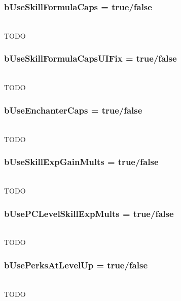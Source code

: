 \documentclass[12pt]{amsart}
\begin{document}
\startblock
\subsubsection{bUseSkillFormulaCaps = \textlangle true/false\textrangle}\hfill\\

TODO

\stopblock

\startblock
\subsubsection{bUseSkillFormulaCapsUIFix = \textlangle true/false\textrangle}\hfill\\

TODO

\stopblock

\startblock
\subsubsection{bUseEnchanterCaps = \textlangle true/false\textrangle}\hfill\\

TODO

\stopblock

\startblock
\subsubsection{bUseSkillExpGainMults = \textlangle true/false\textrangle}\hfill\\

TODO

\stopblock

\startblock
\subsubsection{bUsePCLevelSkillExpMults = \textlangle true/false\textrangle}\hfill\\

TODO

\stopblock

\startblock
\subsubsection{bUsePerksAtLevelUp = \textlangle true/false\textrangle}\hfill\\

TODO

\stopblock

\startblock
\end{document}
